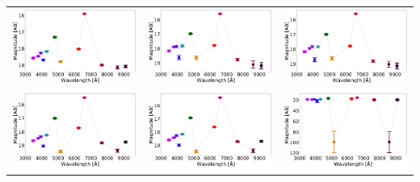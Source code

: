 \begin{table}[!h]
\begin{tabular}{ccc}
\includegraphics[width=0.3\linewidth, clip]{photopectrum_splus_MC0115-350934_aper.pdf} & \includegraphics[width=0.3\linewidth, clip]{photopectrum_splus_MC0115-350934_auto.pdf} & \includegraphics[width=0.3\linewidth, clip]{photopectrum_splus_MC0115-350934_petro.pdf} \\
\includegraphics[width=0.3\linewidth, clip]{photopectrum_splus_MC0115-402039_aper.pdf} & \includegraphics[width=0.3\linewidth, clip]{photopectrum_splus_MC0115-402039_auto.pdf} & \includegraphics[width=0.3\linewidth, clip]{photopectrum_splus_MC0115-402039_petro.pdf} \\

\end{tabular}
\end{table}
